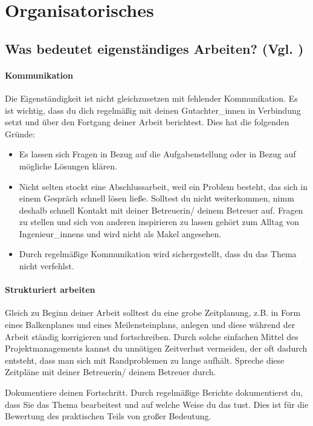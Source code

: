 \section{Organisatorisches}

\subsection{Was bedeutet eigenständiges Arbeiten? (Vgl. \cite{Menge})} 

\paragraph{Kommunikation}
Die Eigenständigkeit ist nicht gleichzusetzen mit fehlender Kommunikation. Es ist wichtig, dass du dich regelmäßig mit deinen Gutachter\_innen in Verbindung setzt und über den
Fortgang deiner Arbeit berichtest. Dies hat die folgenden Gründe:
\begin{itemize}
    \item Es lassen sich Fragen in Bezug auf die Aufgabenstellung oder in Bezug auf mögliche Lösungen klären.
    \item Nicht selten stockt eine Abschlussarbeit, weil ein Problem besteht, das sich in einem Gespräch schnell lösen ließe. Solltest du nicht weiterkommen, nimm deshalb schnell Kontakt mit deiner Betreuerin/ deinem Betreuer auf. Fragen zu stellen und sich von anderen inspirieren zu lassen gehört zum Alltag von Ingenieur\_innens und wird nicht als Makel angesehen.
    \item Durch regelmäßige Kommunikation wird sichergestellt, dass du das Thema nicht verfehlst.
\end{itemize}

\paragraph{Strukturiert arbeiten}
\label{sec:struktur}

Gleich zu Beginn deiner Arbeit solltest du eine grobe Zeitplanung, z.B. in Form eines Balkenplanes und eines Meilensteinplans, anlegen und diese während der Arbeit ständig korrigieren und fortschreiben. Durch solche einfachen Mittel des Projektmanagements kannst du unnötigen Zeitverlust vermeiden, der oft dadurch entsteht, dass man sich mit Randproblemen zu lange aufhält. Spreche diese Zeitpläne mit deiner Betreuerin/ deinem Betreuer durch.

Dokumentiere deinen Fortschritt. Durch regelmäßige Berichte dokumentierst du, dass Sie das Thema bearbeitest und auf welche Weise du das tust. Dies ist für die Bewertung des praktischen Teils von großer Bedeutung.

